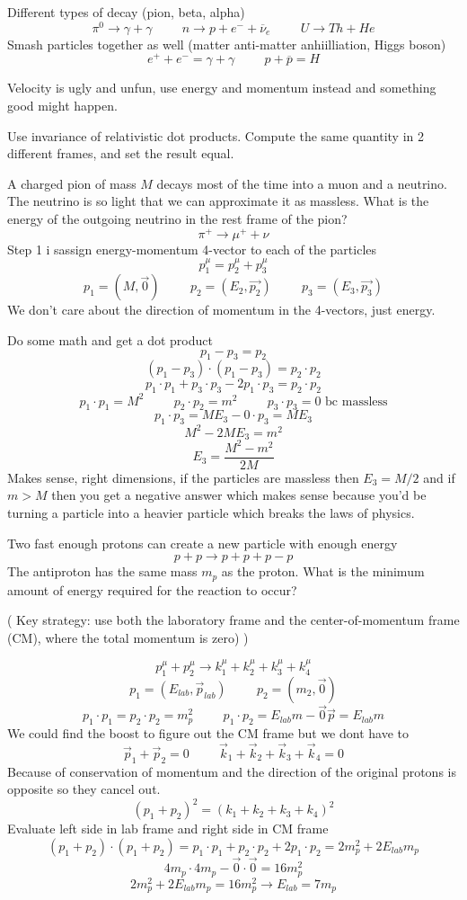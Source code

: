 \documentclass{report}
\newcommand{\hp}{\hspace{1cm}}
\begin{document}
Different types of decay (pion, beta, alpha)
\[
\pi^0 \rightarrow \gamma + \gamma 
\hp
n \rightarrow p + e^- + \overline{\nu}_e
\hp
U \rightarrow Th + He
\]
Smash particles together as well (matter anti-matter anhiilliation, Higgs boson)
\[
e^+ + e^- = \gamma + \gamma
\hp
p + \overline{p} = H
\]

Velocity is ugly and unfun, use energy and momentum instead and something good might happen. 

Use invariance of relativistic dot products. Compute the same quantity in 2 different frames, and set the result equal.

A charged pion of mass $M$ decays most of the time into a muon and a neutrino. The neutrino is so light that we can approximate it as massless. What is the energy of the outgoing neutrino in the rest frame of the pion?
\[
\pi^+ \rightarrow \mu^+ + \nu
\]
Step 1 i sassign energy-momentum 4-vector to each of the particles
\[
p^\mu_1 = p^\mu_2 + p^\mu_3
\]
\[
p_1 = (M, \vec{0})
\hp
p_2 = (E_2, \vec{p_2})
\hp
p_3 = (E_3, \vec{p_3})
\]
We don't care about the direction of momentum in the 4-vectors, just energy.

Do some math and get a dot product
\[
p_1 - p_3 = p_2
\]
\[
(p_1 - p_3) \cdot (p_1 - p_3) = p_2 \cdot p_2
\]
\[
p_1 \cdot p_1 + p_3 \cdot p_3 - 2p_1 \cdot p_3 = p_2 \cdot p_2
\]
\[
p_1 \cdot p_1 = M^2
\hp
p_2 \cdot p_2 = m^2
\hp
p_3 \cdot p_3 = 0 \textrm{ bc massless}
\]
\[
p_1 \cdot p_3 = ME_3 - 0 \cdot p_3 = ME_3
\]
\[
M^2 - 2ME_3 = m^2
\]
\[
E_3 = \frac{M^2 - m^2}{2M}
\]
Makes sense, right dimensions, if the particles are massless then $E_3 = M/2$ and if $m > M$ then you get a negative answer which makes sense because you'd be turning a particle into a heavier particle which breaks the laws of physics.

Two fast enough protons can create a new particle with enough energy
\[
p + p \rightarrow p + p + p - p
\]
The antiproton has the same mass $m_p$ as the proton. What is the minimum amount of energy required for the reaction to occur?

(
Key strategy: use both the laboratory frame and the center-of-momentum frame (CM), where the total momentum is zero)
)

\[
p^\mu_1 + p^\mu_2 \rightarrow k^\mu_1 + k^\mu_2 + k^\mu_3 + k^\mu_4
\]
\[
p_1 = (E_{lab}, \vec{p}_{lab} )
\hp
p_2 = (m_2, \vec{0})
\]
\[
p_1 \cdot p_1 = p_2 \cdot p_2 = m^2_p
\hp
p_1 \cdot p_2 = E_{lab}m - \vec{0}\vec{p} = E_{lab}m
\]
We could find the boost to figure out the CM frame but we dont have to
\[
\vec{p}_1 + \vec{p}_2 = 0
\hp
\vec{k}_1 + \vec{k}_2 + \vec{k}_3 + \vec{k}_4 = 0
\]
Because of conservation of momentum and the direction of the original protons is opposite so they cancel out.
\[
(p_1 + p_2)^2 = (k_1 + k_2 + k_3 + k_4)^2
\]
Evaluate left side in lab frame and right side in CM frame
\[
(p_1 + p_2) \cdot (p_1 + p_2) = p_1 \cdot p_1 + p_2 \cdot p_2 + 2p_1 \cdot p_2 = 2m^2_p + 2E_{lab}m_p
\]
\[
4m_p \cdot 4m_p - \vec{0} \cdot \vec{0} = 16m^2_p
\]
\[
2m^2_p + 2E_{lab}m_p = 16m^2_p \longrightarrow
E_{lab} = 7m_p
\]
\end{document}
